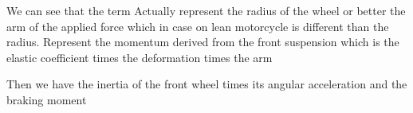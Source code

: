 \documentclass{article}
\begin{document}
\begin{maplegroup}
\begin{Maple Normal}{
We can see that the term
Actually represent the radius of the wheel or better the arm of the applied force which in case on lean motorcycle is different than the radius.
Represent the momentum derived from the front suspension which is the elastic coefficient times the deformation times the arm
}\end{Maple Normal}

\begin{Maple Normal}{
Then we have the inertia of the front wheel times its angular acceleration and the braking moment
}\end{Maple Normal}
\end{maplegroup}
\end{document}
